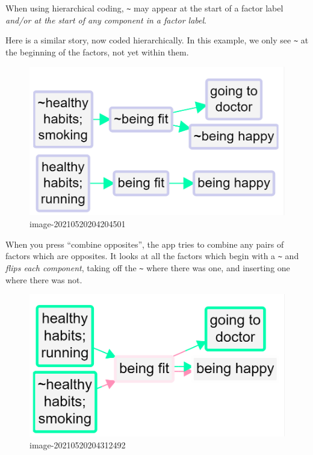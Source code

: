 \documentclass[
]{book}
\begin{document}
When using hierarchical coding, \texttt{\textasciitilde{}} may appear at the start of a factor label \emph{and/or at the start of any component in a factor label}.

Here is a similar story, now coded hierarchically. In this example, we only see \texttt{\textasciitilde{}} at the beginning of the factors, not yet within them.

\begin{figure}
\centering
\includegraphics[width=6.77083in,height=\textheight]{_assets/image-20210520204204501.png}
\caption{image-20210520204204501}
\end{figure}

When you press ``combine opposites'', the app tries to combine any pairs of factors which are opposites. It looks at all the factors which begin with a \texttt{\textasciitilde{}} and \emph{flips each component}, taking off the \texttt{\textasciitilde{}} where there was one, and inserting one where there was not.

\begin{figure}
\centering
\includegraphics[width=6.77083in,height=\textheight]{_assets/image-20210520204312492.png}
\caption{image-20210520204312492}
\end{figure}
\end{document}
